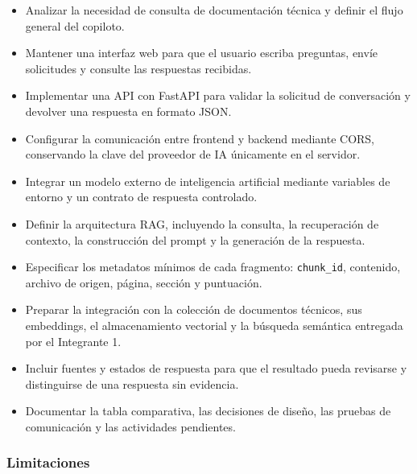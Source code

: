 \begin{itemize}
    \item Analizar la necesidad de consulta de documentación técnica y definir el flujo general del copiloto.
    \item Mantener una interfaz web para que el usuario escriba preguntas, envíe solicitudes y consulte las respuestas recibidas.
    \item Implementar una API con FastAPI para validar la solicitud de conversación y devolver una respuesta en formato JSON.
    \item Configurar la comunicación entre frontend y backend mediante CORS, conservando la clave del proveedor de IA únicamente en el servidor.
    \item Integrar un modelo externo de inteligencia artificial mediante variables de entorno y un contrato de respuesta controlado.
    \item Definir la arquitectura RAG, incluyendo la consulta, la recuperación de contexto, la construcción del prompt y la generación de la respuesta.
    \item Especificar los metadatos mínimos de cada fragmento: \texttt{chunk\_id}, contenido, archivo de origen, página, sección y puntuación.
    \item Preparar la integración con la colección de documentos técnicos, sus embeddings, el almacenamiento vectorial y la búsqueda semántica entregada por el Integrante 1.
    \item Incluir fuentes y estados de respuesta para que el resultado pueda revisarse y distinguirse de una respuesta sin evidencia.
    \item Documentar la tabla comparativa, las decisiones de diseño, las pruebas de comunicación y las actividades pendientes.
\end{itemize}

\subsubsection{Limitaciones}

